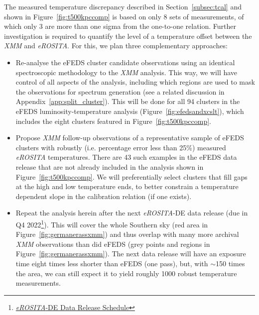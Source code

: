 \documentclass[fleqn,usenatbib]{mnras}
\begin{document}

The measured temperature discrepancy described in Section~\ref{subsec:tcal} and shown in Figure~\ref{fig:t500kpccomp} is based on only 8 sets of measurements, of which only 3 are more than one sigma from the one-to-one relation. Further investigation is required to quantify the level of a temperature offset between the {\em XMM} and {\em eROSITA}. For this, we plan three complementary approaches:
\begin{itemize}
\item{Re-analyse the eFEDS cluster candidate observations using an identical spectroscopic methodology to the {\em XMM} analysis. This way, we will have control of all aspects of the analysis, including which regions are used to mask the observations for spectrum generation (see a related discussion in Appendix~\ref{app:split_cluster}). This will be done for all 94 clusters in the eFEDS luminosity-temperature analysis (Figure~\ref{fig:efedsandxcslt}), which includes the eight clusters featured in Figure~\ref{fig:t500kpccomp}.}
\item{Propose {\em XMM} follow-up observations of a representative sample of eFEDS clusters with robustly (i.e. percentage error less than 25\%) measured {\em eROSITA} temperatures. There are 43 such examples in the eFEDS data release that are not already included in the analysis shown in Figure~\ref{fig:t500kpccomp}. We will preferentially select clusters that fill gaps at the high and low temperature ends, to better constrain a temperature dependent slope in the calibration relation (if one exists).}
\item{Repeat the analysis herein after the next {\em eROSITA}-DE data release (due in Q4 2022\footnote{\href{https://erosita.mpe.mpg.de/erass/}{{\em eROSITA}-DE Data Release Schedule}}). This will cover the whole Southern sky (red area in Figure~\ref{fig:germanerassxmm}) and thus overlap with many more archival {\em XMM} observations than did eFEDS (grey points and regions in Figure~\ref{fig:germanerassxmm}). The next data release will have an exposure time eight times less shorter than eFEDS (one pass), but, with ${\sim}$150 times the area, we can still expect it to yield roughly 1000 robust temperature measurements.}
\end{itemize}
\end{document}
